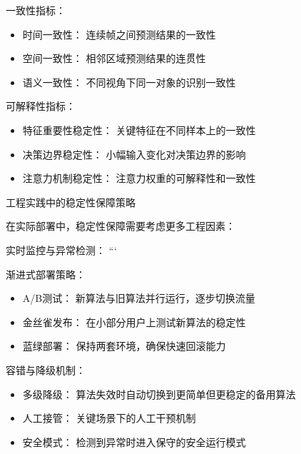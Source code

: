 一致性指标：
\begin{itemize}
\item 时间一致性： 连续帧之间预测结果的一致性
\item 空间一致性： 相邻区域预测结果的连贯性
\item 语义一致性： 不同视角下同一对象的识别一致性
\end{itemize}

可解释性指标：
\begin{itemize}
\item 特征重要性稳定性： 关键特征在不同样本上的一致性
\item 决策边界稳定性： 小幅输入变化对决策边界的影响
\item 注意力机制稳定性： 注意力权重的可解释性和一致性
\end{itemize}

工程实践中的稳定性保障策略

在实际部署中，稳定性保障需要考虑更多工程因素：

实时监控与异常检测：
%    
%        
%        
%        
```

渐进式部署策略：
\begin{itemize}
\item A/B测试： 新算法与旧算法并行运行，逐步切换流量
\item 金丝雀发布： 在小部分用户上测试新算法的稳定性
\item 蓝绿部署： 保持两套环境，确保快速回滚能力
\end{itemize}

容错与降级机制：
\begin{itemize}
\item 多级降级： 算法失效时自动切换到更简单但更稳定的备用算法
\item 人工接管： 关键场景下的人工干预机制
\item 安全模式： 检测到异常时进入保守的安全运行模式
\end{itemize}

